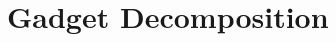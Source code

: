 \section{Gadget Decomposition}
\label{sec:gadget-decomposition}

\newcommand{\decomp}[2]{\mathsf{Decomp}^{#2}(#1)}


